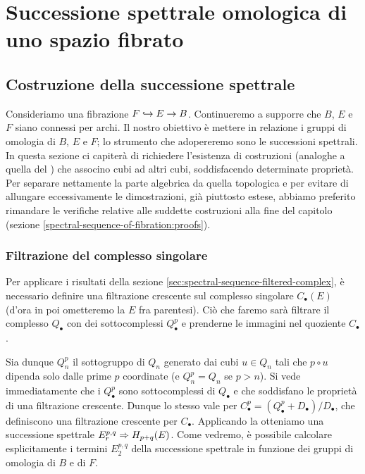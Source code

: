\chapter{Successione spettrale omologica di uno spazio fibrato}
\label{ch:homological-spectral-sequence-of-fibration}
\section{Costruzione della successione spettrale}
Consideriamo una fibrazione $F\hookrightarrow E\to B$. Continueremo a supporre che $B$, $E$ e $F$ siano connessi per archi. Il nostro obiettivo è mettere in relazione i gruppi di omologia di $B$, $E$ e $F$; lo strumento che adopereremo sono le successioni spettrali. In questa sezione ci capiterà di richiedere l'esistenza di costruzioni (analoghe a quella del ) che associno cubi ad altri cubi, soddisfacendo determinate proprietà. Per separare nettamente la parte algebrica da quella topologica e per evitare di allungare eccessivamente le dimostrazioni, già piuttosto estese, abbiamo preferito rimandare le verifiche relative alle suddette costruzioni alla fine del capitolo (sezione \ref{spectral-sequence-of-fibration:proofs}).

\subsection{Filtrazione del complesso singolare}
Per applicare i risultati della sezione \ref{sec:spectral-sequence-filtered-complex}, è necessario definire una filtrazione crescente sul complesso singolare $C_\bullet(E)$ (d'ora in poi ometteremo la $E$ fra parentesi). Ciò che faremo sarà filtrare il complesso $Q_\bullet$ con dei sottocomplessi $Q^p_\bullet$ e prenderne le immagini nel quoziente $C_\bullet$.

Sia dunque $Q^p_n$ il sottogruppo di $Q_n$ generato dai cubi $u\in Q_n$ tali che $p\circ u$ dipenda solo dalle prime $p$ coordinate (e $Q^p_n=Q_n$ se $p>n$). Si vede immediatamente che i $Q^p_\bullet$ sono sottocomplessi di $Q_\bullet$ e che soddisfano le proprietà di una filtrazione crescente. Dunque lo stesso vale per $C^p_\bullet=(Q^p_\bullet+D_\bullet)/D_\bullet$, che definiscono una filtrazione crescente per $C_\bullet$. Applicando la  otteniamo una successione spettrale $E^{p,q}_r\Rightarrow H_{p+q}(E)$. Come vedremo, è possibile calcolare esplicitamente i termini $E^{p,q}_2$ della successione spettrale in funzione dei gruppi di omologia di $B$ e di $F$.

